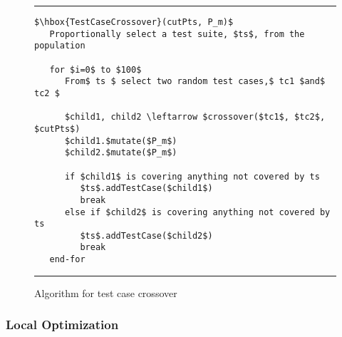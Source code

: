 \documentclass[runningheads]{llncs}
\begin{document}
\begin{figure}[h!]
	\begin{center}
		\hrule
		\medskip
		\begin{Verbatim}[fontfamily=tt, xleftmargin=10pt, commandchars=\\\{\},
		codes={\catcode`$=3\catcode`^=7\catcode`_=8}]
$\hbox{TestCaseCrossover}(cutPts, P_m)$  
   Proportionally select a test suite, $ts$, from the population

   for $i=0$ to $100$
      From$ ts $ select two random test cases,$ tc1 $and$ tc2 $

      $child1, child2 \leftarrow $crossover($tc1$, $tc2$, $cutPts$)
      $child1.$mutate($P_m$)
      $child2.$mutate($P_m$)

      if $child1$ is covering anything not covered by ts
         $ts$.addTestCase($child1$)
         break
      else if $child2$ is covering anything not covered by ts
         $ts$.addTestCase($child2$)
         break
   end-for
		\end{Verbatim}
		\hrule
	\end{center}
	\caption{Algorithm for test case crossover \label{fig:tcCross}}
\end{figure}

\FloatBarrier
\subsubsection{Local Optimization}
\end{document}

